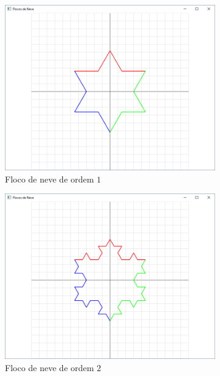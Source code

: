 \begin{enumerate}
\begin{enumerate}
      \begin{figure}[!htp]
          \centering
          \begin{subfigure}[b]{0.4\textwidth}
              \centerline{\includegraphics[width=.9\textwidth]{img/cap4_ex15}}
              \caption{Floco de neve de ordem $1$}
              \label{fig:cap04_ex15a}
          \end{subfigure}
          \hfill
          \begin{subfigure}[b]{0.4\textwidth}
              \centerline{\includegraphics[width=.9\textwidth]{img/cap4_ex15b}}
              \caption{Floco de neve de ordem $2$}
              \label{fig:cap04_ex15b}
          \end{subfigure}
          \hfill
          \begin{subfigure}[b]{0.4\textwidth}

\end{subfigure}
\end{figure}
\end{enumerate}
\end{enumerate}
